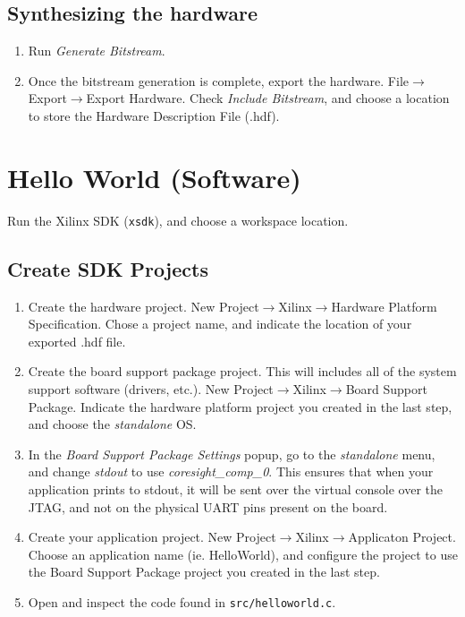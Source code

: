 \subsection{Synthesizing the hardware}
\begin{enumerate}
	\item Run \emph{Generate Bitstream}.
	\item Once the bitstream generation is complete, export the hardware.  File$\rightarrow$Export$\rightarrow$Export Hardware.  Check \emph{Include Bitstream}, and choose a location to store the Hardware Description File (.hdf). 
\end{enumerate}


\section{Hello World (Software)}

Run the Xilinx SDK (\texttt{xsdk}), and choose a workspace location.

\subsection{Create SDK Projects}
\begin{enumerate}
	\item Create the hardware project.  New Project$\rightarrow$Xilinx$\rightarrow$Hardware Platform Specification.  Chose a project name, and indicate the location of your exported .hdf file.
	\item Create the board support package project.  This will includes all of the system support software (drivers, etc.).  New Project$\rightarrow$Xilinx$\rightarrow$Board Support Package.  Indicate the hardware platform project you created in the last step, and choose the \emph{standalone} OS. 
	\item In the \emph{Board Support Package Settings} popup, go to the \emph{standalone} menu, and change \emph{stdout} to use \emph{coresight\_comp\_0}.  This ensures that when your application prints to stdout, it will be sent over the virtual console over the JTAG, and not on the physical UART pins present on the board.  
	\item Create your application project.  New Project$\rightarrow$Xilinx$\rightarrow$Applicaton Project.  Choose an application name (ie. HelloWorld), and configure the project to use the Board Support Package project you created in the last step.
	\item Open and inspect the code found in \texttt{src/helloworld.c}.
\end{enumerate}

